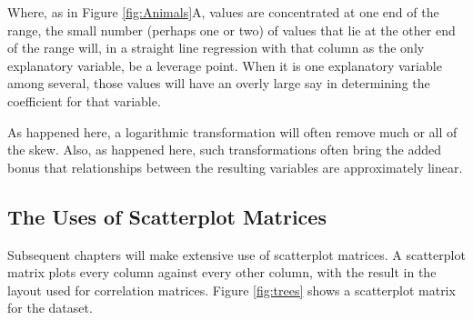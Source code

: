 Where, as in Figure \ref{fig:Animals}A, values are concentrated at one
end of the range, the small number (perhaps one or two) of values that
lie at the other end of the range will, in a straight line regression
with that column as the only explanatory variable, be a leverage
point.  When it is one explanatory variable among several, those
values will have an overly large say in determining the coefficient
for that variable.

As happened here, a logarithmic transformation will often remove much
or all of the skew.  Also, as happened here, such transformations often
bring the added bonus that relationships between the resulting
variables are approximately linear.

\subsection{The Uses of Scatterplot Matrices}\label{sec:spm}

Subsequent chapters will make extensive use of scatterplot matrices.
A scatterplot matrix plots every column against every other column,
with the result in the layout used for correlation matrices.  Figure
\ref{fig:trees} shows a scatterplot matrix for the
 dataset.  

